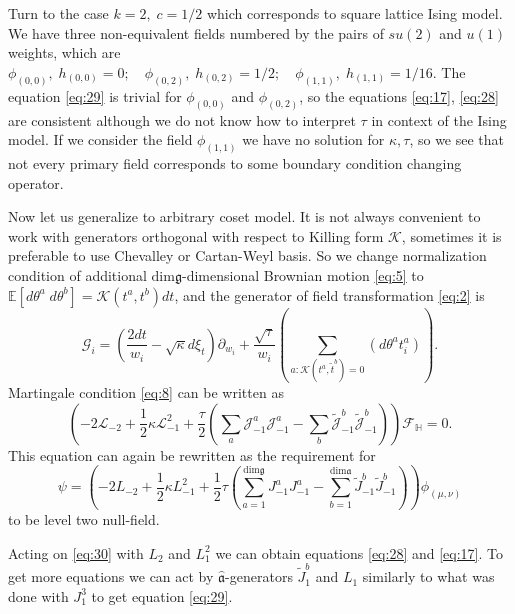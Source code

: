 \documentclass[a4paper]{jpconf}
\theoremstyle{definition}
\newcommand{\gf}{\mathfrak{g}}
\newcommand{\af}{\mathfrak{a}}
\newcommand{\afh}{\hat{\mathfrak{a}}}
\theoremstyle{definition} \newtheorem{Def}{Definition}
\begin{document}
Turn to the case $k=2, \;c=1/2$ which corresponds to square lattice Ising model. We have three non-equivalent fields numbered by the pairs of $su(2)$ and $u(1)$ weights, which are $\phi_{(0,0)}, \; h_{(0,0)}=0; \quad \phi_{(0,2)}, \; h_{(0,2)}=1/2; \quad \phi_{(1,1)}, \; h_{(1,1)}=1/16$.
The equation \eqref{eq:29} is trivial for $\phi_{(0,0)}$ and $\phi_{(0,2)}$, so the equations \eqref{eq:17}, \eqref{eq:28} are consistent although we do not know how to interpret $\tau$ in context of the Ising model. If we consider the field $\phi_{(1,1)}$ we have no solution for $\kappa,\tau$, so we see that not every primary field corresponds to some boundary condition changing operator. 

Now let us generalize to arbitrary coset model. It is not always convenient to work with generators orthogonal with respect to Killing form $\mathcal{K}$, sometimes it is preferable to use Chevalley or Cartan-Weyl basis. So we change normalization condition of additional $\mathrm{dim}\gf$-dimensional Brownian motion \eqref{eq:5} to $\mathbb{E}\left[d\theta^{a}\; d\theta^{b}\right]=\mathcal{K}(t^{a},t^{b})dt$, and the generator of field transformation \eqref{eq:2} is
\begin{equation*}
  \mathcal{G}_{i}=\left(\frac{2dt}{w_{i}}-\sqrt{\kappa} d\xi_{t}\right) \partial_{w_{i}}+\frac{\sqrt{\tau}}{w_{i}}\left(\sum_{a:\mathcal{K}(t^{a},\tilde{t}^{b})=0}\left(d \theta ^{a} t^{a}_{i}\right)\right).
\end{equation*}
 Martingale condition  \eqref{eq:8} can be written as
\begin{equation*}
  \left(-2 \mathcal{L}_{-2}+\frac{1}{2}\kappa \mathcal{L}_{-1}^{2}+\frac{\tau}{2}\left( \sum_{a} \mathcal{J}^{a}_{-1} \mathcal{J}^{a}_{-1}-
      \sum_{b}\tilde{\mathcal{J}}^{b}_{-1} \tilde{\mathcal{J}}^{b}_{-1}\right)\right)        \mathcal{F}_{\mathbb{H}}=0.
\end{equation*}
This equation can again be rewritten as the requirement for
\begin{equation}
  \psi=\left(-2L_{-2}+\frac{1}{2}\kappa L_{-1}^{2}+\frac{1}{2}\tau \left(\sum_{a=1}^{\mathrm{dim}\gf}J^{a}_{-1}J^{a}_{-1}-\sum_{b=1}^{\mathrm{dim}\af}\tilde{J}^{b}_{-1}\tilde{J}^{b}_{-1}\right)\right) \phi_{(\mu,\nu)}
\label{eq:30}
\end{equation}
to be level two null-field.

Acting on \eqref{eq:30} with $L_{2}$ and $L_{1}^{2}$ we can obtain equations \eqref{eq:28} and \eqref{eq:17}. To get more equations we can act by $\afh$-generators $\tilde{J}^{b}_{1}$ and $L_{1}$ similarly to what was done with $J^{3}_{1}$ to get equation \eqref{eq:29}. 
\end{document}
